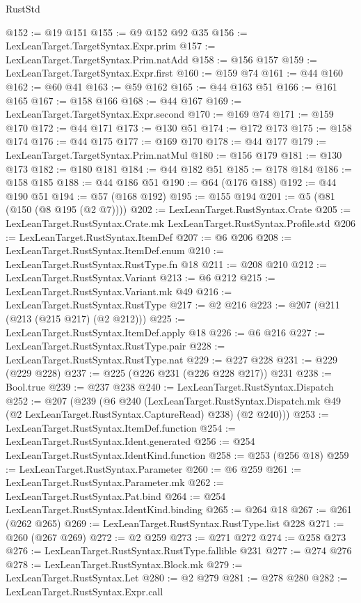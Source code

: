 \begin{lexlean}{RustStd}
\begin{coremodule}
{\begin{coremodule}
{{{{{{{@152 := @19 @151
@155 := @9 @152 @92 @35
@156 := LexLeanTarget.TargetSyntax.Expr.prim
@157 := LexLeanTarget.TargetSyntax.Prim.natAdd
@158 := @156 @157
@159 := LexLeanTarget.TargetSyntax.Expr.first
@160 := @159 @74
@161 := @44 @160
@162 := @60 @41
@163 := @59 @162
@165 := @44 @163 @51
@166 := @161 @165
@167 := @158 @166
@168 := @44 @167
@169 := LexLeanTarget.TargetSyntax.Expr.second
@170 := @169 @74
@171 := @159 @170
@172 := @44 @171
@173 := @130 @51
@174 := @172 @173
@175 := @158 @174
@176 := @44 @175
@177 := @169 @170
@178 := @44 @177
@179 := LexLeanTarget.TargetSyntax.Prim.natMul
@180 := @156 @179
@181 := @130 @173
@182 := @180 @181
@184 := @44 @182 @51
@185 := @178 @184
@186 := @158 @185
@188 := @44 @186 @51
@190 := @64 (@176 @188)
@192 := @44 @190 @51
@194 := @57 (@168 @192)
@195 := @155 @194
@201 := @5 (@81 (@150 (@8 @195 (@2 @7))))
@202 := LexLeanTarget.RustSyntax.Crate
@205 := LexLeanTarget.RustSyntax.Crate.mk LexLeanTarget.RustSyntax.Profile.std
@206 := LexLeanTarget.RustSyntax.ItemDef
@207 := @6 @206
@208 := LexLeanTarget.RustSyntax.ItemDef.enum
@210 := LexLeanTarget.RustSyntax.RustType.fn @18
@211 := @208 @210
@212 := LexLeanTarget.RustSyntax.Variant
@213 := @6 @212
@215 := LexLeanTarget.RustSyntax.Variant.mk @49
@216 := LexLeanTarget.RustSyntax.RustType
@217 := @2 @216
@223 := @207 (@211 (@213 (@215 @217) (@2 @212)))
@225 := LexLeanTarget.RustSyntax.ItemDef.apply @18
@226 := @6 @216
@227 := LexLeanTarget.RustSyntax.RustType.pair
@228 := LexLeanTarget.RustSyntax.RustType.nat
@229 := @227 @228
@231 := @229 (@229 @228)
@237 := @225 (@226 @231 (@226 @228 @217)) @231
@238 := Bool.true
@239 := @237 @238
@240 := LexLeanTarget.RustSyntax.Dispatch
@252 := @207
    (@239
      (@6
        @240
        (LexLeanTarget.RustSyntax.Dispatch.mk @49 (@2 LexLeanTarget.RustSyntax.CaptureRead) @238)
        (@2 @240)))
@253 := LexLeanTarget.RustSyntax.ItemDef.function
@254 := LexLeanTarget.RustSyntax.Ident.generated
@256 := @254 LexLeanTarget.RustSyntax.IdentKind.function
@258 := @253 (@256 @18)
@259 := LexLeanTarget.RustSyntax.Parameter
@260 := @6 @259
@261 := LexLeanTarget.RustSyntax.Parameter.mk
@262 := LexLeanTarget.RustSyntax.Pat.bind
@264 := @254 LexLeanTarget.RustSyntax.IdentKind.binding
@265 := @264 @18
@267 := @261 (@262 @265)
@269 := LexLeanTarget.RustSyntax.RustType.list @228
@271 := @260 (@267 @269)
@272 := @2 @259
@273 := @271 @272
@274 := @258 @273
@276 := LexLeanTarget.RustSyntax.RustType.fallible @231
@277 := @274 @276
@278 := LexLeanTarget.RustSyntax.Block.mk
@279 := LexLeanTarget.RustSyntax.Let
@280 := @2 @279
@281 := @278 @280
@282 := LexLeanTarget.RustSyntax.Expr.call
}}}}}}}
\end{coremodule}}
\end{coremodule}
\end{lexlean}
